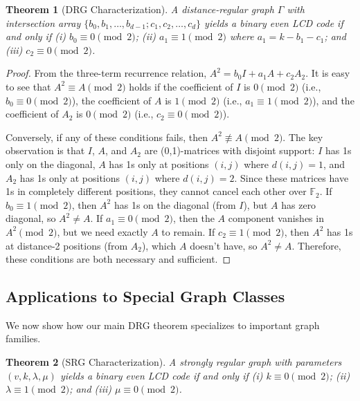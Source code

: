 \documentclass[a4paper,11pt]{article}
\newtheorem{theorem}{Theorem}[section]
\theoremstyle{remark}
\newcommand{\FF}{\mathbb{F}}
\begin{document}
\begin{theorem}[DRG Characterization]\label{thm:drg-main}
A distance-regular graph $\Gamma$ with intersection array $\{b_0, b_1, \ldots, b_{d-1}; c_1, c_2, \ldots, c_d\}$ yields a binary even LCD code if and only if (i) $b_0 \equiv 0 \pmod 2$; (ii) $a_1 \equiv 1 \pmod 2$ where $a_1 = k - b_1 - c_1$; and (iii) $c_2 \equiv 0 \pmod 2$.
\end{theorem}

\begin{proof}
From the three-term recurrence relation, $A^2 = b_0 I + a_1 A + c_2 A_2$.
It is easy to see that $A^2 \equiv A \pmod 2$ holds if the coefficient of $I$ is $0 \pmod 2$ (i.e., $b_0 \equiv 0 \pmod 2$), the coefficient of $A$ is $1 \pmod 2$ (i.e., $a_1 \equiv 1 \pmod 2$), and the coefficient of $A_2$ is $0 \pmod 2$ (i.e., $c_2 \equiv 0 \pmod 2$).

Conversely, if any of these conditions fails, then $A^2 \not\equiv A \pmod 2$. The key observation is that $I$, $A$, and $A_2$ are (0,1)-matrices with disjoint support: $I$ has 1s only on the diagonal, $A$ has 1s only at positions $(i,j)$ where $d(i,j) = 1$, and $A_2$ has 1s only at positions $(i,j)$ where $d(i,j) = 2$. Since these matrices have 1s in completely different positions, they cannot cancel each other over $\FF_2$. If $b_0 \equiv 1 \pmod 2$, then $A^2$ has 1s on the diagonal (from $I$), but $A$ has zero diagonal, so $A^2 \neq A$. If $a_1 \equiv 0 \pmod 2$, then the $A$ component vanishes in $A^2 \pmod 2$, but we need exactly $A$ to remain. If $c_2 \equiv 1 \pmod 2$, then $A^2$ has 1s at distance-2 positions (from $A_2$), which $A$ doesn't have, so $A^2 \neq A$. Therefore, these conditions are both necessary and sufficient.
\end{proof}

\subsection{Applications to Special Graph Classes}

We now show how our main DRG theorem specializes to important graph families.

\begin{theorem}[SRG Characterization]\label{thm:srg-from-drg}
A strongly regular graph with parameters $(v, k, \lambda, \mu)$ yields a binary even LCD code if and only if (i) $k \equiv 0 \pmod 2$; (ii) $\lambda \equiv 1 \pmod 2$; and (iii) $\mu \equiv 0 \pmod 2$.
\end{theorem}
\end{document}
